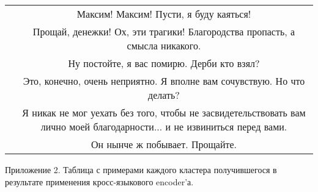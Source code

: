 \documentclass[a4paper,14pt]{article}
\begin{document}
\begin{center}
\begin{tabularx}{\linewidth}{ | N | C | }
&Максим! Максим! Пусти, я буду каяться!\\
&Прощай, денежки! Ох, эти трагики! Благородства пропасть, а смысла никакого.\\
&Ну постойте, я вас помирю. Дерби кто взял?\\
&Это, конечно, очень неприятно. Я вполне вам сочувствую. Но что делать? \\
&Я никак не мог уехать без того, чтобы не засвидетельствовать вам лично моей благодарности... и не извиниться перед вами.\\
&Он нынче ж побывает. Прощайте.\\
\hline
\end{tabularx}
\end{center}

\pagebreak

\begin{flushright}
Приложение 2. Таблица с примерами каждого кластера получившегося в результате применения кросс-языкового encoder'а.
\end{flushright}
\end{document}
